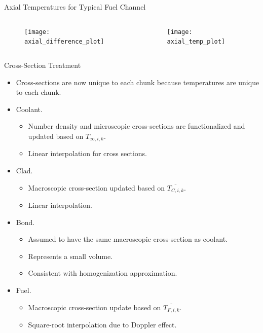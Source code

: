 \begin{frame}{Axial Temperatures for Typical Fuel Channel}
  \begin{columns}
    \begin{column}{0.5\textwidth}
      \begin{figure}
        \centering
        \texttt{[image: axial\_difference\_plot]}
        \label{fig:axial_difference_plot}
      \end{figure}
    \end{column}
    \begin{column}{0.5\textwidth}
      \begin{figure}
        \centering
        \texttt{[image: axial\_temp\_plot]}
        \label{fig:axial_temp_plot}
      \end{figure}
    \end{column}
  \end{columns}
\end{frame}

\begin{frame}{Cross-Section Treatment}
  \begin{itemize}
    \item Cross-sections are now unique to each chunk because temperatures are
      unique to each chunk.
    \item Coolant. 
      \begin{itemize}
        \item Number density and microscopic cross-sections are functionalized 
          and updated based on $T_{\infty,i,k}$.
        \item Linear interpolation for cross sections.
      \end{itemize}
    \item Clad. 
      \begin{itemize}
        \item Macroscopic cross-section updated based on $\overline{T_{C,i,k}}$.
        \item Linear interpolation.
      \end{itemize}
    \item Bond.
      \begin{itemize}
        \item Assumed to have the same macroscopic cross-section as coolant.
        \item Represents a small volume.
        \item Consistent with homogenization approximation.
      \end{itemize}
    \item Fuel.
      \begin{itemize}
        \item Macroscopic cross-section update based on $\overline{T_{F,i,k}}$.
        \item Square-root interpolation due to Doppler effect.
      \end{itemize}
  \end{itemize}
\end{frame}

